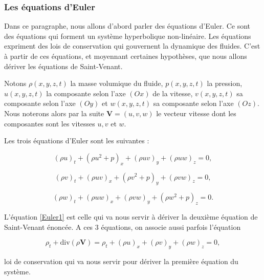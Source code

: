 \documentclass[
11pt, %
francais, %
singlespacing, %
headsepline, %
f%
]{MastersDoctoralThesis} %
\theoremstyle{definition}
\begin{document}
\subsubsection{Les équations d'Euler}

Dans ce paragraphe, nous allons d'abord parler des équations d'Euler. Ce sont des équations qui forment un système hyperbolique non-linéaire. Les équations expriment des lois de conservation qui gouvernent la dynamique des fluides. C'est à partir de ces équations, et moyennant certaines hypothèses, que nous allons dériver les équations de Saint-Venant. 

Notons $\rho(x,y,z,t)$ la masse volumique du fluide, $p(x,y,z,t)$ la pression, $u(x,y,z,t)$ la composante selon l'axe $(Ox)$ de la vitesse, $v(x,y,z,t)$ sa composante selon l'axe $(Oy)$ et $w(x,y,z,t)$ sa composante selon l'axe $(Oz)$. Nous noterons alors par la suite $\textbf{V}=(u,v,w )$ le vecteur vitesse dont les composantes sont les vitesses $u, v$ et $w$. 

Les trois équations d'Euler sont les suivantes :


\begin{equation} (\rho u)_{t} + (\rho u^{2}+p)_{x}+(\rho uv)_{y}+(\rho uw)_{z} =0, \label{Euler1} \end{equation}

\begin{equation} (\rho v)_{t} + (\rho uv)_{x}+(\rho v^{2}+p)_{y}+(\rho vw)_{z} =0,\label{Euler2}\end{equation}

\begin{equation} (\rho w)_{t} + (\rho u w)_{x}+(\rho vw)_{y}+(\rho w^{2}+p)_{z} =0.\label{Euler3}\end{equation}

L'équation \eqref{Euler1} est celle qui va nous servir à dériver la deuxième équation de Saint-Venant énoncée. A ces 3 équations, on associe aussi parfois l'équation 

\begin{equation} \rho_{t}+\text{div}(\rho\textbf{V})=\rho_{t} + (\rho u)_{x}+(\rho v)_{y}+(\rho w)_{z} =0, \label{Euler0} \end{equation}

loi de conservation qui va nous servir pour dériver la première équation du système.
\end{document}
